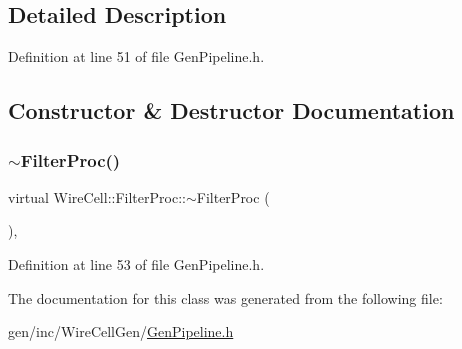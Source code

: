 \subsection{Detailed Description}


Definition at line 51 of file Gen\+Pipeline.\+h.



\subsection{Constructor \& Destructor Documentation}
\mbox{\label{class_wire_cell_1_1_filter_proc_a215b7b7f0a6c85d332888d18bb1d18d5}} 
\subsubsection{\texorpdfstring{$\sim$\+Filter\+Proc()}{~FilterProc()}}
{\footnotesize\ttfamily virtual Wire\+Cell\+::\+Filter\+Proc\+::$\sim$\+Filter\+Proc (\begin{DoxyParamCaption}{ }\end{DoxyParamCaption})\hspace{0.3cm}{\ttfamily [inline]}, {\ttfamily [virtual]}}



Definition at line 53 of file Gen\+Pipeline.\+h.



The documentation for this class was generated from the following file\+:\begin{DoxyCompactItemize}
\item 
gen/inc/\+Wire\+Cell\+Gen/\hyperlink{_gen_pipeline_8h}{Gen\+Pipeline.\+h}\end{DoxyCompactItemize}
